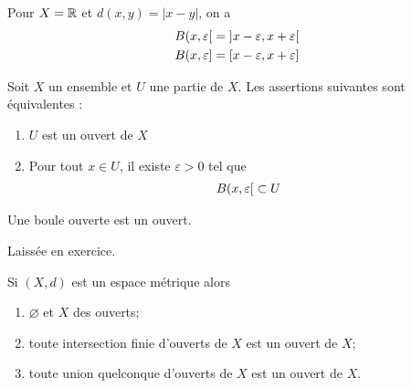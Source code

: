 \documentclass[french,a4paper,10pt]{article}
\begin{document}
	\begin{myexample}
		Pour $X=\mathbb{R}$ et $d(x,y)=|x-y|$, on a
		\[\begin{aligned}
			B(x,\varepsilon\mathopen{}[\mathclose{}=\mathopen{]}x-\varepsilon, x+\varepsilon\mathclose{[}\\
			B(x,\varepsilon\mathopen{}]\mathclose{}=\mathopen{[}x-\varepsilon, x+\varepsilon\mathclose{]}
		\end{aligned}\]
	\end{myexample}
	
	\begin{definition}
		Soit $X$ un ensemble et $U$ une partie de $X$. Les assertions suivantes sont équivalentes :
		\begin{enumerate}[label=$(\roman*)$]
			\item $U$ est un ouvert de $X$
			\item Pour tout $x\in U$, il existe $\varepsilon>0$ tel que
			\[\begin{aligned}
				B({x,\varepsilon}\mathopen{}[\mathclose{}\subset U
			\end{aligned}\]
		\end{enumerate}
	\end{definition}
	
	
	\begin{myexample}
		Une boule ouverte est un ouvert.
	\end{myexample}
	\begin{myproof}
		Laissée en exercice.
	\end{myproof}
	
	\begin{myremark}
		Si $(X,d)$ est un espace métrique alors
		\begin{enumerate}
			\item $\varnothing$ et $X$ des ouverts;
			\item toute intersection finie d'ouverts de $X$ est un ouvert de $X$;
			\item toute union quelconque d'ouverts de $X$ est un ouvert de $X$.
		\end{enumerate}
	\end{myremark}
	
\end{document}
